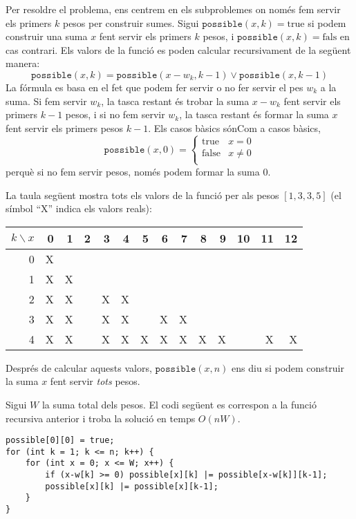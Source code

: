 Per resoldre el problema, ens centrem en els subproblemes
on només fem servir els primers $k$ pesos
per construir sumes.
Sigui $\texttt{possible}(x,k)=\textrm{true}$ si
podem construir una suma $x$
fent servir els primers $k$ pesos,
i $\texttt{possible}(x,k)=\textrm{fals}$ en cas contrari.
Els valors de la funció es poden calcular recursivament
de la següent manera:
\[ \texttt{possible}(x,k) = \texttt{possible}(x-w_k,k-1) \lor \texttt{possible}(x,k-1) \]
La fórmula es basa en el fet que podem
fer servir o no fer servir el pes $w_k$ a la suma.
Si fem servir $w_k$, la tasca restant és
trobar la suma $x-w_k$ fent servir els primers $k-1$ pesos,
i si no fem servir $w_k$,
la tasca restant és formar la suma $x$
fent servir els primers pesos $k-1$.
Els casos bàsics sónCom a casos bàsics,
\begin{equation*}
    \texttt{possible}(x,0) = \begin{cases}
               \textrm{true}    & x = 0\\
               \textrm{false}   & x \neq 0 \\
           \end{cases}
\end{equation*}
perquè si no fem servir pesos, només podem formar la suma 0.

La taula següent mostra tots els valors de la funció
per als pesos $[1,3,3,5]$ (el símbol ``X''
indica els valors reals):

\begin{center}
\begin{tabular}{r|rrrrrrrrrrrrr}
$k \backslash x$ & 0 & 1 & 2 & 3 & 4 & 5 & 6 & 7 & 8 & 9 & 10 & 11 & 12 \\
\hline
 0 & X & \\
 1 & X & X \\
 2 & X & X & & X & X \\
 3 & X & X & & X & X & & X & X \\
 4 & X & X & & X & X & X & X & X & X & X & & X & X \\
\end{tabular}
\end{center}

Després de calcular aquests valors, $\texttt{possible}(x,n)$
ens diu si podem construir la
suma $x$ fent servir \emph{tots} pesos.

Sigui $W$ la suma total dels pesos.
El codi següent es correspon a la funció recursiva anterior i troba la
solució en temps $O(nW)$.
\begin{lstlisting}
possible[0][0] = true;
for (int k = 1; k <= n; k++) {
    for (int x = 0; x <= W; x++) {
        if (x-w[k] >= 0) possible[x][k] |= possible[x-w[k]][k-1];
        possible[x][k] |= possible[x][k-1];
    }
}
\end{lstlisting}

